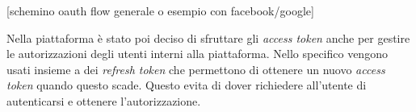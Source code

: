[schemino oauth flow generale o esempio con facebook/google]

Nella piattaforma è stato poi deciso di sfruttare gli \textit{access token} anche per gestire le autorizzazioni
degli utenti interni alla piattaforma. Nello specifico vengono usati insieme a dei \textit{refresh token} che permettono
di ottenere un nuovo \textit{access token} quando questo scade. Questo evita di dover richiedere all'utente di autenticarsi
e ottenere l'autorizzazione.

